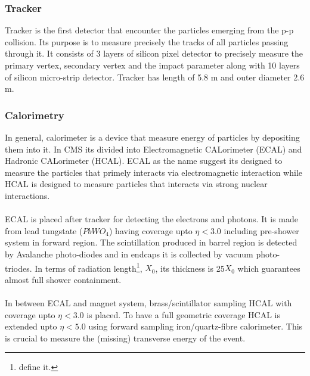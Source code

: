 \subsubsection{Tracker} %
\label{ssub:tracker}
Tracker is the first detector that encounter the particles emerging from the p-p collision. Its purpose is to measure precisely the tracks of all particles passing through it. It consists of 3 layers of silicon pixel detector to precisely measure the primary vertex, secondary vertex and the impact parameter along with 10 layers of  silicon micro-strip detector. Tracker has length of 5.8 m and outer diameter 2.6 m.



\subsubsection{Calorimetry} %
\label{ssub:calorimetry}
In general, calorimeter is a device that measure energy of particles by depositing them into it. In CMS its divided into Electromagnetic CALorimeter (ECAL) and Hadronic CALorimeter (HCAL). ECAL as the name suggest its designed to measure the particles that primely interacts via electromagnetic interaction while HCAL is designed to measure particles that interacts via strong nuclear interactions.\\\\
ECAL is placed after tracker for detecting the electrons and photons. It is made from lead tungstate ($PbWO_4$) having coverage upto $\eta < 3.0$ including pre-shower system in forward region. The scintillation produced in barrel region is detected by Avalanche photo-diodes and in endcaps it is collected by vacuum photo-triodes. In terms of radiation length\footnote{define it.}, $X_0$, its thickness is 25$X_0$ which guarantees almost full shower containment.\\\\
In between ECAL and magnet system, brass/scintillator sampling HCAL with coverage upto $\eta < 3.0$ is placed. To have a full geometric coverage HCAL is extended upto $\eta < 5.0$ using forward sampling iron/quartz-fibre calorimeter. This is crucial to measure the (missing) transverse energy of the event. 


